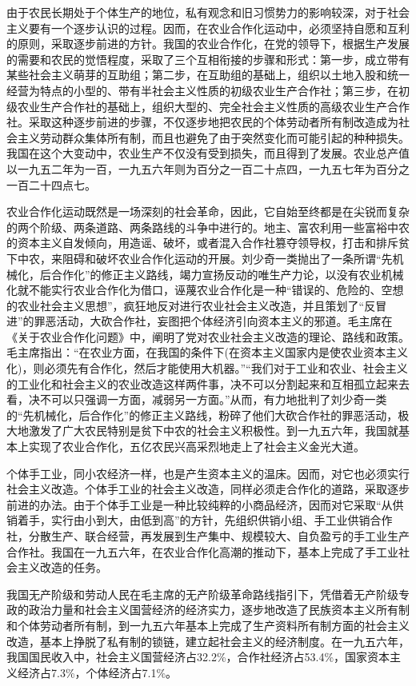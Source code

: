 \documentclass{book}
\begin{document}
由于农民长期处于个体生产的地位，私有观念和旧习惯势力的影响较深，对于社会主义要有一个逐步认识的过程。因而，在农业合作化运动中，必须坚持自愿和互利的原则，采取逐步前进的方针。我国的农业合作化，在党的领导下，根据生产发展的需要和农民的觉悟程度，采取了三个互相衔接的步骤和形式：第一步，成立带有某些社会主义萌芽的互助组；第二步，在互助组的基础上，组织以土地入股和统一经营为特点的小型的、带有半社会主义性质的初级农业生产合作社；第三步，在初级农业生产合作社的基础上，组织大型的、完全社会主义性质的高级农业生产合作社。采取这种逐步前进的步骤，不仅逐步地把农民的个体劳动者所有制改造成为社会主义劳动群众集体所有制，而且也避免了由于突然变化而可能引起的种种损失。我国在这个大变动中，农业生产不仅没有受到损失，而且得到了发展。农业总产值以一九五二年为一百，一九五六年则为百分之一百二十点四，一九五七年为百分之一百二十四点七。

农业合作化运动既然是一场深刻的社会革命，因此，它自始至终都是在尖锐而复杂的两个阶级、两条道路、两条路线的斗争中进行的。地主、富农利用一些富裕中农的资本主义自发倾向，用造谣、破坏，或者混入合作社篡夺领导权，打击和排斥贫下中农，来阻碍和破坏农业合作化运动的开展。刘少奇一类抛出了一条所谓“先机械化，后合作化”的修正主义路线，竭力宣扬反动的唯生产力论，以没有农业机械化就不能实行农业合作化为借口，诬蔑农业合作化是一种“错误的、危险的、空想的农业社会主义思想”，疯狂地反对进行农业社会主义改造，并且策划了“反冒进”的罪恶活动，大砍合作社，妄图把个体经济引向资本主义的邪道。毛主席在《关于农业合作化问题》中，阐明了党对农业社会主义改造的理论、路线和政策。毛主席指出：“在农业方面，在我国的条件下(在资本主义国家内是使农业资本主义化)，则必须先有合作化，然后才能使用大机器。”“我们对于工业和农业、社会主义的工业化和社会主义的农业改造这样两件事，决不可以分割起来和互相孤立起来去看，决不可以只强调一方面，减弱另一方面。”从而，有力地批判了刘少奇一类的“先机械化，后合作化”的修正主义路线，粉碎了他们大砍合作社的罪恶活动，极大地激发了广大农民特别是贫下中农的社会主义积极性。到一九五六年，我国就基本上实现了农业合作化，五亿农民兴高采烈地走上了社会主义金光大道。

个体手工业，同小农经济一样，也是产生资本主义的温床。因而，对它也必须实行社会主义改造。个体手工业的社会主义改造，同样必须走合作化的道路，采取逐步前进的办法。由于个体手工业是一种比较纯粹的小商品经济，因而对它采取“从供销着手，实行由小到大，由低到高”的方针，先组织供销小组、手工业供销合作社，分散生产、联合经营，再发展到生产集中、规模较大、自负盈亏的手工业生产合作社。我国在一九五六年，在农业合作化高潮的推动下，基本上完成了手工业社会主义改造的任务。

我国无产阶级和劳动人民在毛主席的无产阶级革命路线指引下，凭借着无产阶级专政的政治力量和社会主义国营经济的经济实力，逐步地改造了民族资本主义所有制和个体劳动者所有制，到一九五六年基本上完成了生产资料所有制方面的社会主义改造，基本上挣脱了私有制的锁链，建立起社会主义的经济制度。在一九五六年，我国国民收入中，社会主义国营经济占32.2\%，合作社经济占53.4\%，国家资本主义经济占7.3\%，个体经济占7.1\%。
\end{document}
